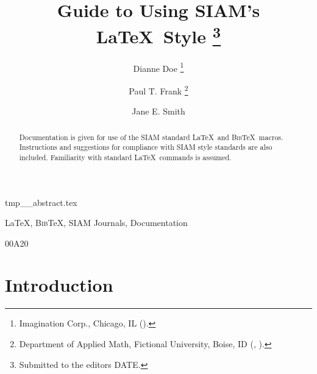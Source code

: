 \documentclass[final]{siamart1116}
\title{Guide to Using SIAM's \LaTeX\ Style%
  \thanks{Submitted to the editors DATE.
\funding{Funding information goes here.}}}
\author{Dianne Doe%
  \thanks{Imagination Corp., Chicago, IL (\email{ddoe@imag.com}).}%
  \and
  Paul T. Frank%
  \thanks{Department of Applied Math, Fictional University, Boise, ID
    (\email{ptfrank@fictional.edu}, \email{jesmith@fictional.edu}).}
  \and
  Jane E. Smith%
  \footnotemark[3]
}
\numberwithin{theorem}{section}
\newcommand{\BibTeX}{{\scshape Bib}\TeX\xspace}
\begin{document}
\maketitle

\begin{tcbverbatimwrite}{tmp_\jobname_abstract.tex}
\begin{abstract}
  Documentation is given for use of the SIAM standard \LaTeX\ and \BibTeX\
  macros.  Instructions and suggestions for compliance with SIAM style
  standards are also included. Familiarity with standard \LaTeX\
  commands is assumed.
\end{abstract}

\begin{keywords}
  \LaTeX, \BibTeX, SIAM Journals, Documentation 
\end{keywords}

\begin{AMS}
  00A20 
\end{AMS}
\end{tcbverbatimwrite}


\section{Introduction}
\label{sec:intro}
\end{document}
